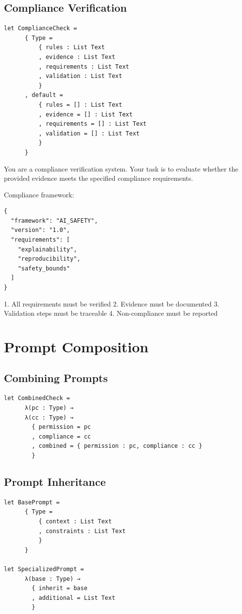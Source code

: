 \documentclass[11pt]{book}
\newenvironment{prompt}[1]
  {\begin{tcolorbox}[colback=promptcolor!5,colframe=promptcolor!50,title=Prompt: #1]}
  {\end{tcolorbox}}
\newenvironment{context}
  {\begin{tcolorbox}[colback=contextcolor!5,colframe=contextcolor!50,title=Context]}
  {\end{tcolorbox}}
\newenvironment{constraints}
  {\begin{tcolorbox}[colback=constraintcolor!5,colframe=constraintcolor!50,title=Constraints]}
  {\end{tcolorbox}}
\begin{document}
\section{Compliance Verification}
\begin{prompt}{Compliance Check}
\begin{verbatim}
let ComplianceCheck =
      { Type =
          { rules : List Text
          , evidence : List Text
          , requirements : List Text
          , validation : List Text
          }
      , default =
          { rules = [] : List Text
          , evidence = [] : List Text
          , requirements = [] : List Text
          , validation = [] : List Text
          }
      }
\end{verbatim}

\begin{context}
You are a compliance verification system. Your task is to evaluate whether the provided evidence meets the specified compliance requirements.

Compliance framework:
\begin{verbatim}
{
  "framework": "AI_SAFETY",
  "version": "1.0",
  "requirements": [
    "explainability",
    "reproducibility",
    "safety_bounds"
  ]
}
\end{verbatim}
\end{context}

\begin{constraints}
1. All requirements must be verified
2. Evidence must be documented
3. Validation steps must be traceable
4. Non-compliance must be reported
\end{constraints}
\end{prompt}

\chapter{Prompt Composition}

\section{Combining Prompts}
\begin{verbatim}
let CombinedCheck =
      λ(pc : Type) →
      λ(cc : Type) →
        { permission = pc
        , compliance = cc
        , combined = { permission : pc, compliance : cc }
        }
\end{verbatim}

\section{Prompt Inheritance}
\begin{verbatim}
let BasePrompt =
      { Type =
          { context : List Text
          , constraints : List Text
          }
      }

let SpecializedPrompt =
      λ(base : Type) →
        { inherit = base
        , additional = List Text
        }
\end{verbatim}
\end{document}

